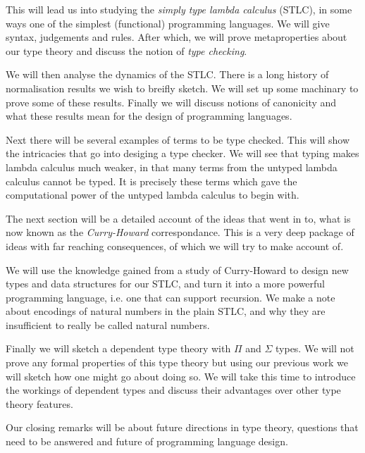 This will lead us into studying the \emph{simply type lambda calculus} (STLC), in some ways one of the simplest (functional) programming languages. We will give syntax, judgements and rules. After which, we will prove metaproperties about our type theory and discuss the notion of \emph{type checking}.

We will then analyse the dynamics of the STLC. There is a long history of normalisation results we wish to breifly sketch. We will set up some machinary to prove some of these results. Finally we will discuss notions of canonicity and what these results mean for the design of programming languages.

Next there will be several examples of terms to be type checked. This will show the intricacies that go into desiging a type checker. We will see that typing makes lambda calculus much weaker, in that many terms from the untyped lambda calculus cannot be typed. It is precisely these terms which gave the computational power of the untyped lambda calculus to begin with.

The next section will be a detailed account of the ideas that went in to, what is now known as the \emph{Curry-Howard} correspondance. This is a very deep package of ideas with far reaching consequences, of which we will try to make account of.

We will use the knowledge gained from a study of Curry-Howard to design new types and data structures for our STLC, and turn it into a more powerful programming language, i.e. one that can support recursion. We make a note about encodings of natural numbers in the plain STLC, and why they are insufficient to really be called natural numbers.

Finally we will sketch a dependent type theory with $\Pi$ and $\Sigma$ types. We will not prove any formal properties of this type theory but using our previous work we will sketch how one might go about doing so. We will take this time to introduce the workings of dependent types and discuss their advantages over other type theory features.

Our closing remarks will be about future directions in type theory, questions that need to be answered and future of programming language design.






